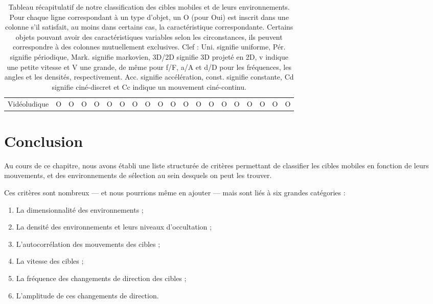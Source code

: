\begin{landscape}
\begin{table}
\begin{adjustbox}{max width=\linewidth}
\begin{tabular}{l|lll|l|l|l|l|l|l|l|l|l|l|l|l|l|l|l|l}
		Vidéoludique   & O        & O                              & O     & O       & O  & O     & O  & O & O & O        & O          & O         & O         & O & O & O & O & O & O
		\end{tabular}
		\end{adjustbox}
		\caption[Classification des cibles mobiles et environnement de sélection]{Tableau récapitulatif de notre classification des cibles mobiles et de leurs environnements. Pour chaque ligne correspondant à un type d'objet, un O (pour Oui) est inscrit dans une colonne s'il satisfait, au moins dans certains cas, la caractéristique correspondante. Certains objets pouvant avoir des caractéristiques variables selon les circonstances, ils peuvent correspondre à des colonnes mutuellement exclusives. Clef : Uni. signifie uniforme, Pér. signifie périodique, Mark. signifie markovien, 3D/2D signifie 3D projeté en 2D, v indique une petite vitesse et V une grande, de même pour f/F, a/A et d/D pour les fréquences, les angles et les densités, respectivement. Acc. signifie accélération, const. signifie constante, Cd signifie ciné-discret et Cc indique un mouvement ciné-continu.}
		\label{tab:recapSelEnvs}
	\end{table}

	\end{landscape}


\section{Conclusion}
	Au cours de ce chapitre, nous avons établi une liste structurée de critères permettant de classifier les cibles mobiles en fonction de leurs mouvements, et des environnements de sélection au sein desquels on peut les trouver.
	
	Ces critères sont nombreux --- et nous pourrions même en ajouter --- mais sont liés à six grandes catégories :
	
	\begin{enumerate}
		\item La dimensionnalité des environnements ;
		\item La densité des environnements et leurs niveaux d'occultation ;
		\item L'autocorrélation des mouvements des cibles ;
		\item La vitesse des cibles ;
		\item La fréquence des changements de direction des cibles ;
		\item L'amplitude de ces changements de direction.
	\end{enumerate}
	
